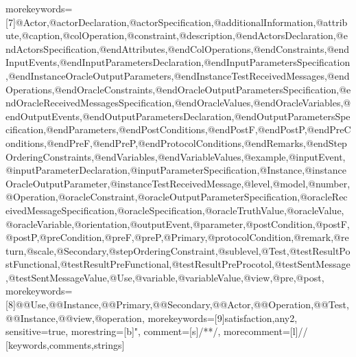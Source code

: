 {    morekeywords=[7]{@Actor,@actorDeclaration,@actorSpecification,@additionalInformation,@attribute,@caption,@colOperation,@constraint,@description,@endActorsDeclaration,@endActorsSpecification,@endAttributes,@endColOperations,@endConstraints,@endInputEvents,@endInputParametersDeclaration,@endInputParametersSpecification,@endInstanceOracleOutputParameters,@endInstanceTestReceivedMessages,@endOperations,@endOracleConstraints,@endOracleOutputParametersSpecification,@endOracleReceivedMessagesSpecification,@endOracleValues,@endOracleVariables,@endOutputEvents,@endOutputParametersDeclaration,@endOutputParametersSpecification,@endParameters,@endPostConditions,@endPostF,@endPostP,@endPreConditions,@endPreF,@endPreP,@endProtocolConditions,@endRemarks,@endStepOrderingConstraints,@endVariables,@endVariableValues,@example,@inputEvent,@inputParameterDeclaration,@inputParameterSpecification,@Instance,@instanceOracleOutputParameter,@instanceTestReceivedMessage,@level,@model,@number,@Operation,@oracleConstraint,@oracleOutputParameterSpecification,@oracleReceivedMessageSpecification,@oracleSpecification,@oracleTruthValue,@oracleValue,@oracleVariable,@orientation,@outputEvent,@parameter,@postCondition,@postF,@postP,@preCondition,@preF,@preP,@Primary,@protocolCondition,@remark,@return,@scale,@Secondary,@stepOrderingConstraint,@sublevel,@Test,@testResultPostFunctional,@testResultPreFunctional,@testResultPreProcotol,@testSentMessage,@testSentMessageValue,@Use,@variable,@variableValue,@view,@pre,@post},
    morekeywords=[8]{@@Use,@@Instance,@@Primary,@@Secondary,@@Actor,@@Operation,@@Test,@@Instance,@@view,@operation},
    morekeywords=[9]{satisfaction,any2},
sensitive=true,
morestring=[b]{"},
comment=[s]{/*}{*/},
morecomment=[l]//
}[keywords,comments,strings]%


\DeclareRobustCommand{\msrsee}{software engineering environment~}

\newcommand\freeblock[4]{%
\begin{textblock}{#1}(#2,#3)
\begin{minipage}{\textwidth}
\setlength{\parindent}{0pt}%
\setlength{\parskip}{0.1cm}%
#4
\end{minipage}
\end{textblock}
}

